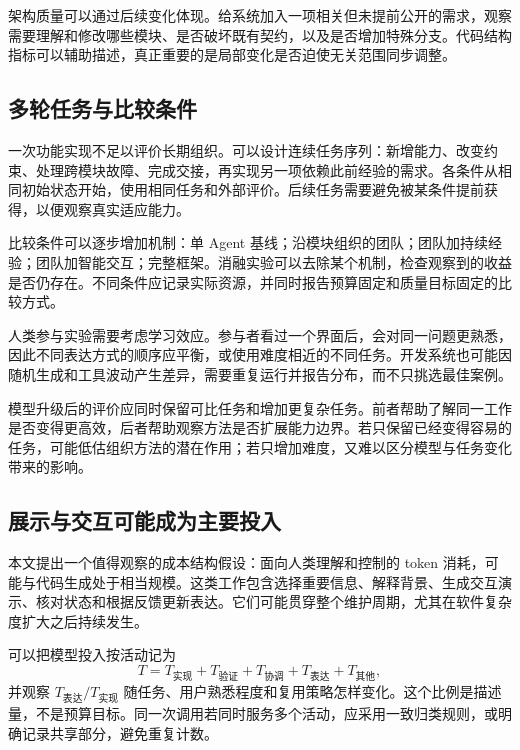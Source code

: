 架构质量可以通过后续变化体现。给系统加入一项相关但未提前公开的需求，观察需要理解和修改哪些模块、是否破坏既有契约，以及是否增加特殊分支。代码结构指标可以辅助描述，真正重要的是局部变化是否迫使无关范围同步调整。

\subsection{多轮任务与比较条件}
一次功能实现不足以评价长期组织。可以设计连续任务序列：新增能力、改变约束、处理跨模块故障、完成交接，再实现另一项依赖此前经验的需求。各条件从相同初始状态开始，使用相同任务和外部评价。后续任务需要避免被某条件提前获得，以便观察真实适应能力。

比较条件可以逐步增加机制：单 Agent 基线；沿模块组织的团队；团队加持续经验；团队加智能交互；完整框架。消融实验可以去除某个机制，检查观察到的收益是否仍存在。不同条件应记录实际资源，并同时报告预算固定和质量目标固定的比较方式。


人类参与实验需要考虑学习效应。参与者看过一个界面后，会对同一问题更熟悉，因此不同表达方式的顺序应平衡，或使用难度相近的不同任务。开发系统也可能因随机生成和工具波动产生差异，需要重复运行并报告分布，而不只挑选最佳案例。

模型升级后的评价应同时保留可比任务和增加更复杂任务。前者帮助了解同一工作是否变得更高效，后者帮助观察方法是否扩展能力边界。若只保留已经变得容易的任务，可能低估组织方法的潜在作用；若只增加难度，又难以区分模型与任务变化带来的影响。

\subsection{展示与交互可能成为主要投入}
本文提出一个值得观察的成本结构假设：面向人类理解和控制的 token 消耗，可能与代码生成处于相当规模。这类工作包含选择重要信息、解释背景、生成交互演示、核对状态和根据反馈更新表达。它们可能贯穿整个维护周期，尤其在软件复杂度扩大之后持续发生。

可以把模型投入按活动记为
\begin{equation}
 T=T_{\text{实现}}+T_{\text{验证}}+T_{\text{协调}}+T_{\text{表达}}+T_{\text{其他}},
\end{equation}
并观察 $T_{\text{表达}}/T_{\text{实现}}$ 随任务、用户熟悉程度和复用策略怎样变化。这个比例是描述量，不是预算目标。同一次调用若同时服务多个活动，应采用一致归类规则，或明确记录共享部分，避免重复计数。

